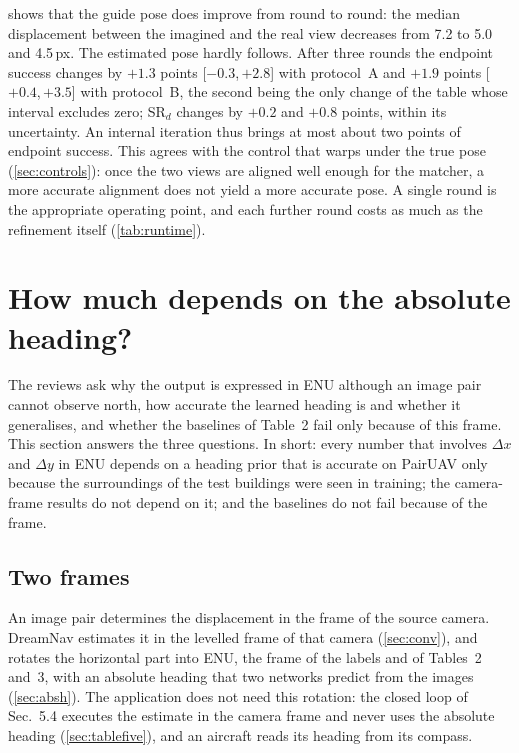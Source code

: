 \documentclass[10pt,twocolumn,letterpaper]{article}
\newcommand{\SRd}{SR$_{d}$}
\newcommand{\ci}[2]{{\scriptsize[\ensuremath{#1},\,\ensuremath{#2}]}}
\begin{document}
 shows that the guide pose does improve from round to round: the median displacement between the imagined and the real view decreases from 7.2 to 5.0 and 4.5\,px. The estimated pose hardly follows. After three rounds the endpoint success changes by \ensuremath{+1.3}{} points \ci{\ensuremath{-0.3}}{\ensuremath{+2.8}} with protocol~A and \ensuremath{+1.9}{} points \ci{\ensuremath{+0.4}}{\ensuremath{+3.5}} with protocol~B, the second being the only change of the table whose interval excludes zero; \SRd{} changes by \ensuremath{+0.2}{} and \ensuremath{+0.8}{} points, within its uncertainty. An internal iteration thus brings at most about two points of endpoint success. This agrees with the control that warps under the true pose (\cref{sec:controls}): once the two views are aligned well enough for the matcher, a more accurate alignment does not yield a more accurate pose. A single round is the appropriate operating point, and each further round costs as much as the refinement itself (\cref{tab:runtime}).

\section{How much depends on the absolute heading?}
\label{sec:heading}

The reviews ask why the output is expressed in ENU although an image pair cannot observe north, how accurate the learned heading is and whether it generalises, and whether the baselines of Table~2 fail only because of this frame. This section answers the three questions. In short: every number that involves $\Delta x$ and $\Delta y$ in ENU depends on a heading prior that is accurate on PairUAV only because the surroundings of the test buildings were seen in training; the camera-frame results do not depend on it; and the baselines do not fail because of the frame.

\subsection{Two frames}
\label{sec:frames}

An image pair determines the displacement in the frame of the source camera. DreamNav estimates it in the levelled frame of that camera (\cref{sec:conv}), and rotates the horizontal part into ENU, the frame of the labels and of Tables~2 and~3, with an absolute heading that two networks predict from the images (\cref{sec:absh}). The application does not need this rotation: the closed loop of Sec.~5.4 executes the estimate in the camera frame and never uses the absolute heading (\cref{sec:tablefive}), and an aircraft reads its heading from its compass.
\end{document}
